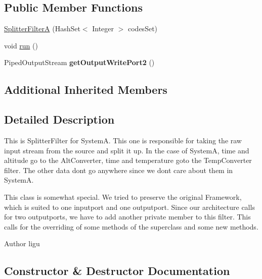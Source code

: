 \subsection*{Public Member Functions}
\begin{DoxyCompactItemize}
\item 
\hyperlink{class_system_a_1_1_splitter_filter_a_a79dc23af7be9dbb22286bce76cb79c18}{Splitter\+Filter\+A} (Hash\+Set$<$ Integer $>$ codes\+Set)
\item 
void \hyperlink{class_system_a_1_1_splitter_filter_a_a7ce43d0ac6d5aaf0c55f5d4417ec286a}{run} ()
\item 
\hypertarget{class_system_a_1_1_splitter_filter_a_abf1e9e0fb5fe6851c77d7724618cf81f}{}Piped\+Output\+Stream {\bfseries get\+Output\+Write\+Port2} ()\label{class_system_a_1_1_splitter_filter_a_abf1e9e0fb5fe6851c77d7724618cf81f}

\end{DoxyCompactItemize}
\subsection*{Additional Inherited Members}


\subsection{Detailed Description}
This is Splitter\+Filter for System\+A. This one is responsible for taking the raw input stream from the source and split it up. In the case of System\+A, time and altitude go to the Alt\+Converter, time and temperature goto the Temp\+Converter filter. The other data don\textquotesingle{}t go anywhere since we don\textquotesingle{}t care about them in System\+A.

This class is somewhat special. We tried to preserve the original Framework, which is suited to one inputport and one outputport. Since our architecture calls for two outputports, we have to add another private member to this filter. This calls for the overriding of some methods of the superclass and some new methods. \begin{DoxyAuthor}{Author}
ligu 
\end{DoxyAuthor}


\subsection{Constructor \& Destructor Documentation}
\hypertarget{class_system_a_1_1_splitter_filter_a_a79dc23af7be9dbb22286bce76cb79c18}{}
